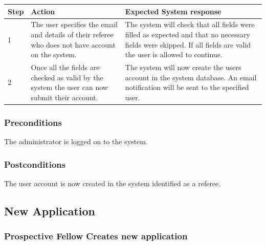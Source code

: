 \documentclass[12pt]{article}
\begin{document}
\begin{center}
\begin{tabular}{|l|p{6cm}|p{8cm}|}
\hline
Step & Action & Expected System response \\
\hline
1 & The user specifies the email and details of their referee who does not have account on the system. & The system will check that all fields were filled as expected and that no necessary fields were skipped. If all fields are valid the user is allowed to continue. \\
\hline
2 & Once all the fields are checked as valid by the system the user can now submit their account. & The system will now create the users account in the system database. An email notification will be sent to the specified user. \\
\hline
\end{tabular}
\end{center}

\subsubsection*{Preconditions}
The administrator is logged on to the system.

\subsubsection*{Postconditions}
The user account is now created in the system identified as a referee.
\subsection{New Application}

\subsubsection{Prospective Fellow Creates new application}
\end{document}
